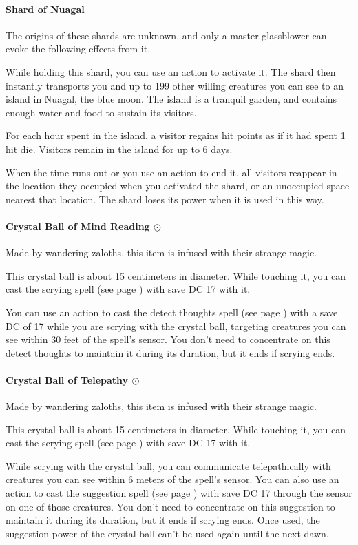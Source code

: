 \paragraph{Shard of Nuagal}
    The origins of these shards are unknown, and only a master glassblower can evoke the following effects from it.

    While holding this shard, you can use an action to activate it.
    The shard then instantly transports you and up to 199 other willing creatures you can see to an island in Nuagal, the blue moon.
    The island is a tranquil garden, and contains enough water and food to sustain its visitors.

    For each hour spent in the island, a visitor regains hit points as if it had spent 1 hit die.
    Visitors remain in the island for up to 6 days.

    When the time runs out or you use an action to end it, all visitors reappear in the location they occupied when you activated the shard, or an unoccupied space nearest that location.
    The shard loses its power when it is used in this way.
\paragraph{Crystal Ball of Mind Reading $\odot$}
    Made by wandering zaloths, this item is infused with their strange magic.

    This crystal ball is about 15 centimeters in diameter.
    While touching it, you can cast the scrying spell (see page \pageref{spell::scrying}) with save DC 17 with it.

    You can use an action to cast the detect thoughts spell (see page \pageref{spell::detectthoughts}) with a save DC of 17 while you are scrying with the crystal ball, targeting creatures you can see within 30 feet of the spell's sensor.
    You don't need to concentrate on this detect thoughts to maintain it during its duration, but it ends if scrying ends.
\paragraph{Crystal Ball of Telepathy $\odot$}
    Made by wandering zaloths, this item is infused with their strange magic.

    This crystal ball is about 15 centimeters in diameter.
    While touching it, you can cast the scrying spell (see page \pageref{spell::scrying}) with save DC 17 with it.

    While scrying with the crystal ball, you can communicate telepathically with creatures you can see within 6 meters of the spell's sensor.
    You can also use an action to cast the suggestion spell (see page \pageref{spell::suggestion}) with save DC 17 through the sensor on one of those creatures.
    You don't need to concentrate on this suggestion to maintain it during its duration, but it ends if scrying ends.
    Once used, the suggestion power of the crystal ball can't be used again until the next dawn.
